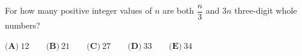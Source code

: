 For how many positive integer values of $n$ are both $\dfrac{n}{3}$ and $3n$ three-digit whole numbers?



$\textbf{(A)}\ 12\qquad
\textbf{(B)}\ 21\qquad
\textbf{(C)}\ 27\qquad
\textbf{(D)}\ 33\qquad
\textbf{(E)}\ 34$
